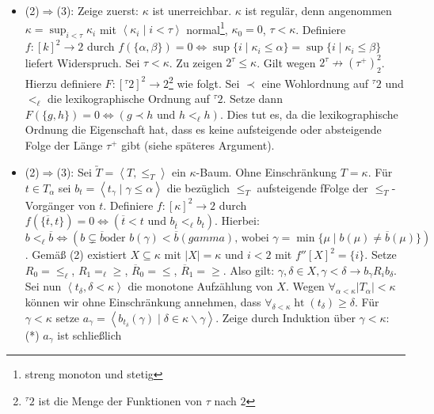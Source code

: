 \documentclass[a4paper,fontsize=11pt]{scrartcl}
\newcommand{\height}{\operatorname{ht}}
\begin{document}
\begin{itemize}
    \item (2)$\Rightarrow$(3): Zeige zuerst: $\kappa$ ist
      unerreichbar. $\kappa$ ist regulär, denn angenommen
      $\kappa=\sup_{i<\tau}\kappa_i$ mit
      $\left<\kappa_i\mid i<\tau\right>$ normal\footnote{streng monoton
        und stetig}, $\kappa_0=0$, $\tau<\kappa$. Definiere
      $f:[k]^2\rightarrow 2$ durch $f(\{\alpha,\beta\})=0
      \Leftrightarrow\sup\{i\mid \kappa_i\le\alpha\}=
      \sup\{i\mid \kappa_i\le\beta\}$ liefert Widerspruch. \newline Sei
      $\tau<\kappa$. Zu zeigen $2^\tau\le\kappa$. Gilt wegen
      $2^\tau\not\rightarrow(\tau^+)_2^2$. Hierzu definiere $F:[^\tau
        2]^2\rightarrow 2$\footnote{$^\tau 2$ ist die Menge der
        Funktionen von $\tau$ nach $2$} wie folgt. Sei $\prec$ eine
      Wohlordnung auf $^\tau 2$ und $<_\ell$ die lexikographische
      Ordnung auf $^\tau 2$. Setze dann
      $F(\{g,h\})=0\Leftrightarrow(g\prec h\mbox{ und }h<_\ell
      h)$. Dies tut es, da die lexikographische Ordnung die
      Eigenschaft hat, dass es keine aufsteigende oder absteigende
      Folge der Länge $\tau^+$ gibt (siehe späteres Argument).
    \item (2)$\Rightarrow$(3): Sei $\utilde{T}=\left<T,\le_T\right>$
      ein $\kappa$-Baum. Ohne Einschränkung $T=\kappa$. Für $t\in
      T_\alpha$ sei $b_t=\left<t_\gamma\mid \gamma\le\alpha\right>$ die
      bezüglich $\le_T$ aufsteigende fFolge der $\le_T$-Vorgänger von
      $t$. Definiere $f:[\kappa]^2\rightarrow 2$ durch
      $f(\{\overline{t},t\})=0\Leftrightarrow(\overline{t}<t\mbox{ und
      }b_{\overline{t}}<_\ell b_t)$. Hierbei:
      $b<_\ell\overline{b}\Leftrightarrow(b\subsetneq\overline{b}\mbox{
        oder }b(\gamma)<\overline{b}(gamma)\mbox{, wobei
      }\gamma=\min\{\mu\mid b(\mu)\neq\overline{b}(\mu)\})$. Gemäß (2)
      existiert $X\subseteq\kappa$ mit $|X|=\kappa$ und $i<2$ mit
      $f''[X]^2=\{i\}$. Setze $R_0=\le_\ell$, $R_1=_\ell\ge$,
      $\overline{R}_0=\le$, $\overline{R}_1=\ge$. Also gilt:
      $\gamma,\delta\in X,\gamma<\delta\rightarrow b_\gamma R_i
      b_\delta$. Sei nun $\left<t_\delta,\delta<\kappa\right>$ die
      monotone Aufzählung von $X$. Wegen $\forall_{\alpha<\kappa}
      |T_\alpha|<\kappa$ können wir ohne Einschränkung annehmen, dass
      $\forall_{\delta<\kappa}\height(t_\delta)\ge\delta$. Für
      $\gamma<\kappa$ setze $a_\gamma= \left<b_{t_\delta}(\gamma)\mid
      \delta\in\kappa\backslash\gamma\right>$. Zeige durch Induktion
      über $\gamma<\kappa$: \newline (*) $a_\gamma$ ist schließlich

\end{itemize}
\end{document}
